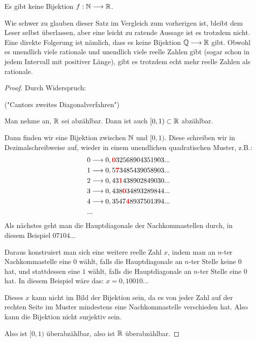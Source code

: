 \begin{theorem}
    \label{theorem-cantor-2}
    Es gibt keine Bijektion $f: \mathbb{N} \longrightarrow \mathbb{R}$.
\end{theorem}
Wie schwer zu glauben dieser Satz im Vergleich zum vorherigen ist, bleibt dem Leser selbst überlassen, aber eine leicht zu ratende Aussage ist es trotzdem nicht. Eine direkte Folgerung ist nämlich, dass es keine Bijektion $\mathbb{Q} \longrightarrow \mathbb{R}$ gibt. Obwohl es unendlich viele rationale und unendlich viele reelle Zahlen gibt (sogar schon in jedem Intervall mit positiver Länge), gibt es trotzdem echt mehr reelle Zahlen als rationale.
\begin{proof}

    Durch Widerspruch:

    ("Cantors zweites Diagonalverfahren")

    Man nehme an, $\mathbb{R}$ sei abzählbar. Dann ist auch $[0, 1) \subset \mathbb{R}$ abzählbar.

    Dann finden wir eine Bijektion zwischen $\mathbb{N}$ und $[0, 1)$. Diese schreiben wir in Dezimalschreibweise auf, wieder in einem unendlichen quadratischen Muster, z.B.:
    \begin{align}
        &0 \longrightarrow 0,\mathbf{\textcolor{red}{0}}32568904351903...\\
        &1 \longrightarrow 0,5\mathbf{\textcolor{red}{7}}3485439058903...\\
        &2 \longrightarrow 0,43\mathbf{\textcolor{red}{1}}438902849030...\\
        &3 \longrightarrow 0,438\mathbf{\textcolor{red}{0}}34893289844...\\
        &4 \longrightarrow 0,3547\mathbf{\textcolor{red}{4}}8937501394...\\
        &...
    \end{align}
    Als nächstes geht man die Hauptdiagonale der Nachkommastellen durch, in diesem Beispiel $07104...$

    Daraus konstruiert man sich eine weitere reelle Zahl $x$, indem man an $n$-ter Nachkommastelle eine $0$ wählt, falls die Hauptdiagonale an $n$-ter Stelle keine $0$ hat, und stattdessen eine $1$ wählt, falls die Hauptdiagonale an $n$-ter Stelle eine $0$ hat. In diesem Beispiel wäre das: $x = 0,10010...$

    Dieses $x$ kann nicht im Bild der Bijektion sein, da es von jeder Zahl auf der rechten Seite im Muster mindestens eine Nachkommastelle verschieden hat. Also kann die Bijektion nicht surjektiv sein.\absurdum

    Also ist $[0, 1)$ überabzählbar, also ist $\mathbb{R}$ überabzählbar.
\end{proof}

